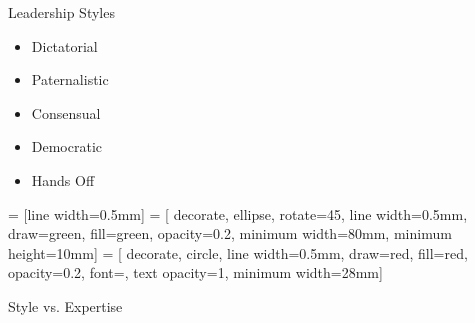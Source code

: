 
\begin{frame}{Leadership Styles}
  \begin{itemize}
    \item Dictatorial
    \item Paternalistic
    \item Consensual
    \item Democratic
    \item Hands Off
  \end{itemize}
\end{frame}

 = [line width=0.5mm]
 = [
    decorate, ellipse, rotate=45, line width=0.5mm, draw=green,
    fill=green, opacity=0.2,
    minimum width=80mm, minimum height=10mm]
 = [
    decorate, circle, line width=0.5mm, draw=red,
    fill=red, opacity=0.2, font=\small, text opacity=1,
    minimum width=28mm]

\begin{frame}[label=style_plot]{Style vs. Expertise}
    \begin{center}
        \HumorSans
    \end{center}

\end{frame}
